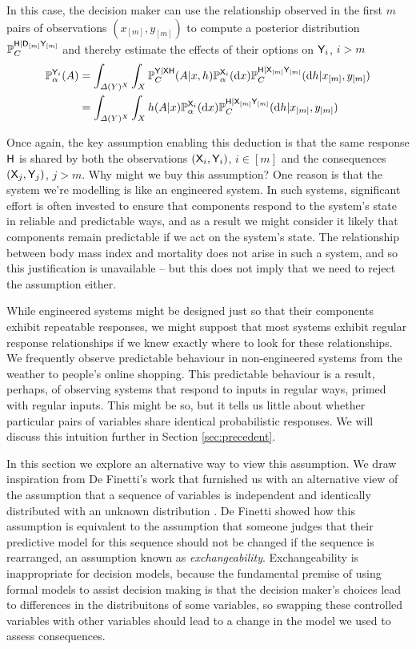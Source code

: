 In this case, the decision maker can use the relationship observed in the first $m$ pairs of observations $(x_{[m]},y_{[m]})$ to compute a posterior distribution $\mathbb{P}_C^{\mathsf{H}|\mathsf{D}_{[m]}\mathsf{Y}_{[m]}}$ and thereby estimate the effects of their options on $\mathsf{Y}_i$, $i>m$
\begin{align}
    \mathbb{P}_\alpha^{\mathsf{Y}_i} (A) &= \int_{\Delta(Y)^X}\int_X \mathbb{P}_C^{\mathsf{Y}|\mathsf{XH}}(A|x,h) \mathbb{P}_\alpha^{\mathsf{X}_i}(\mathrm{d}x)\mathbb{P}_C^{\mathsf{H}|\mathsf{X}_{[m]}\mathsf{Y}_{[m]}}(\mathrm{d}h|x_{[m]},y_{[m]})\\
    &= \int_{\Delta(Y)^X}\int_X h(A|x) \mathbb{P}_\alpha^{\mathsf{X}_i}(\mathrm{d}x)\mathbb{P}_C^{\mathsf{H}|\mathsf{X}_{[m]}\mathsf{Y}_{[m]}}(\mathrm{d}h|x_{[m]},y_{[m]})
\end{align}

Once again, the key assumption enabling this deduction is that the same response $\mathsf{H}$ is shared by both the observations $(\mathsf{X}_i,\mathsf{Y}_i)$, $i\in [m]$ and the consequences $(\mathsf{X}_j,\mathsf{Y}_j)$, $j>m$. Why might we buy this assumption? One reason is that the system we're modelling is like an engineered system. In such systems, significant effort is often invested to ensure that components respond to the system's state in reliable and predictable ways, and as a result we might consider it likely that components remain predictable if we act on the system's state. The relationship between body mass index and mortality does not arise in such a system, and so this justification is unavailable -- but this does not imply that we need to reject the assumption either.

While engineered systems might be designed just so that their components exhibit repeatable responses, we might suppost that most systems exhibit regular response relationships if we knew exactly where to look for these relationships. We frequently observe predictable behaviour in non-engineered systems from the weather to people's online shopping. This predictable behaviour is a result, perhaps, of observing systems that respond to inputs in regular ways, primed with regular inputs. This might be so, but it tells us little about whether particular pairs of variables share identical probabilistic responses. We will discuss this intuition further in Section \ref{sec:precedent}.

In this section we explore an alternative way to view this assumption. We draw inspiration from De Finetti's work that furnished us with an alternative view of the assumption that a sequence of variables is independent and identically distributed with an unknown distribution \citet{de_finetti_foresight_1992}. De Finetti showed how this assumption is equivalent to the assumption that someone judges that their predictive model for this sequence should not be changed if the sequence is rearranged, an assumption known as \emph{exchangeability}. Exchangeability is inappropriate for decision models, because the fundamental premise of using formal models to assist decision making is that the decision maker's choices lead to differences in the distribuitons of some variables, so swapping these controlled variables with other variables should lead to a change in the model we used to assess consequences.  

